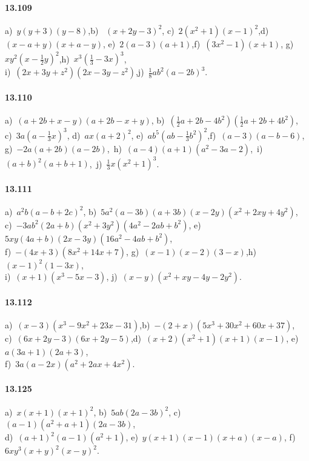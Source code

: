 \paragraph{13.109} a)~$y(y+3)(y-8)$,\quad b)~ $(x+2y-3)^{2}$,\quad
c)~$2(x^{2}+1)(x-1)^{2}$,\quad d)~$(x-a+y)(x+a-y)$,\quad
e)~$2(a-3)(a+1)$,\quad f)~$(3x^{2}-1)(x+1)$,\quad
g)~$xy^{2}(x-\frac{1}{2}y)^{2}$,\quad h)~$x^{3}\left(\frac{1}{3}-3x\right)^{3}$,\protect\\
i)~$(2x+3y+z^{2})(2x-3y-z^{2})$,\quad j)~$\frac{1}{8}{ab}^{2}(a-2b)^{3}$.

\paragraph{13.110} a)~$(a+2b+x-y)(a+2b-x+y)$,\quad 
b)~$\left(\frac{1}{2}a+2b-4b^{2}\right)\left(\frac{1}{2}a+2b+4b^{2}\right)$,\protect\\
c)~$3a\left(a-\frac{1}{3}x\right)^{3}$,\quad
d)~$ax(a+2)^{2}$,\quad
e)~${ab}^{5}\left({ab}-\frac{1}{3}b^{2}\right)^{2}$,\quad f)~$(a-3)(a-b-6)$,\protect\\
g)~$-2a(a+2b)(a-2b)$,\,
h)~$(a-4)(a+1)(a^{2}-3a-2)$,\,
i)~$(a+b)^{2}(a+b+1)$,\, j)~$\frac{1}{3}x(x^{2}+1)^{3}$.

\paragraph{13.111} a)~$a^{2}b(a-b+2c)^{2}$,\quad 
b)~$5a^{2}(a-3b)(a+3b)(x-2y)(x^{2}+2xy+4y^{2})$,\protect\\
c)~$-3{ab}^{2}(2a+b)(x^{2}+3y^{2})(4a^{2}-2{ab}+b^{2})$,\quad %
e)~$5xy(4a+b)(2x-3y)(16a^{2}-4{ab}+b^{2})$,\protect\\
f)~$-(4x+3)(8x^{2}+14x+7)$,\quad
g)~$(x-1)(x-2)(3-x)$,\quad h)~$(x-1)^{2}(1-3x)$,\protect\\
i)~$(x+1)(x^{3}-5x-3)$,\quad
j)~$(x-y)(x^{2}+xy-4y-2y^{2})$.

\paragraph{13.112} a)~$(x-3)(x^{3}-9x^{2}+23x-31)$,\quad b)~$-(2+x)(5x^{3}+30x^{2}+60x+37)$,\protect\\
c)~$(6x+2y-3)(6x+2y-5)$,\quad d)~$(x+2)\left(x^{2}+1\right)(x+1)(x-1)$,\quad
e)~$a(3a+1)(2a+3)$,\protect\\ f)~$3a(a-2x)\left(a^{2}+2ax+4x^{2}\right)$.

\paragraph{13.125}
a)~$x(x+1)(x+1)^{2}$,\quad 
b)~$5ab(2a-3b)^{2}$,\quad 
c)~$(a-1)\left(a^{2}+a+1\right)(2a-3b)$,\protect\\
d)~$(a+1)^{2}(a-1)\left(a^{2}+1\right)$,\quad 
e)~$y(x+1)(x-1)(x+a)(x-a)$,\quad 
f)~$6xy^{3}(x+y)^{2}(x-y)^{2}$.


